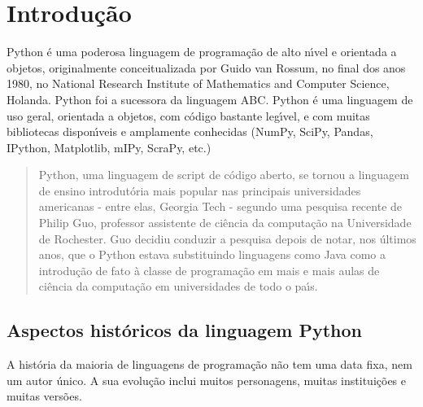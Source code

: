 


\chapter{ Introdu\c{c}\~{a}o}

Python \'{e} uma poderosa linguagem de programa\c{c}\~{a}o de alto n\'{\i}vel e orientada a objetos, originalmente conceitualizada por Guido van Rossum, no final dos anos 1980, no National Research Institute of Mathematics and Computer Science, Holanda. Python foi a sucessora da linguagem ABC. Python \'{e} uma linguagem  de uso geral, orientada a objetos, com c\'{o}digo bastante leg\'{\i}vel, e com muitas bibliotecas dispon\'{\i}veis e amplamente conhecidas (NumPy, SciPy, Pandas, IPython, Matplotlib, mIPy, ScraPy, etc.)
\begin{quote}
  Python, uma linguagem de script de c\'{o}digo aberto, se tornou a linguagem de ensino introdut\'{o}ria mais popular nas principais universidades americanas - entre elas, Georgia Tech - segundo uma pesquisa recente de Philip Guo, professor assistente de ci\^{e}ncia da computa\c{c}\~{a}o na Universidade de Rochester. Guo decidiu conduzir a pesquisa depois de notar, nos \'{u}ltimos anos, que o Python estava substituindo linguagens como Java como a introdu\c{c}\~{a}o de fato \`{a} classe de programa\c{c}\~{a}o em mais e mais aulas de ci\^{e}ncia da computa\c{c}\~{a}o em universidades de todo o pa\'{\i}s. \cite{Shein2015}
\end{quote}


   \section{Aspectos hist\'{o}ricos da linguagem Python}

A hist\'{o}ria da maioria de linguagens de programa\c{c}\~{a}o n\~{a}o tem uma data fixa, nem um autor \'{u}nico. A sua evolu\c{c}\~{a}o inclui muitos personagens, muitas institui\c{c}\~{o}es e muitas vers\~{o}es.

